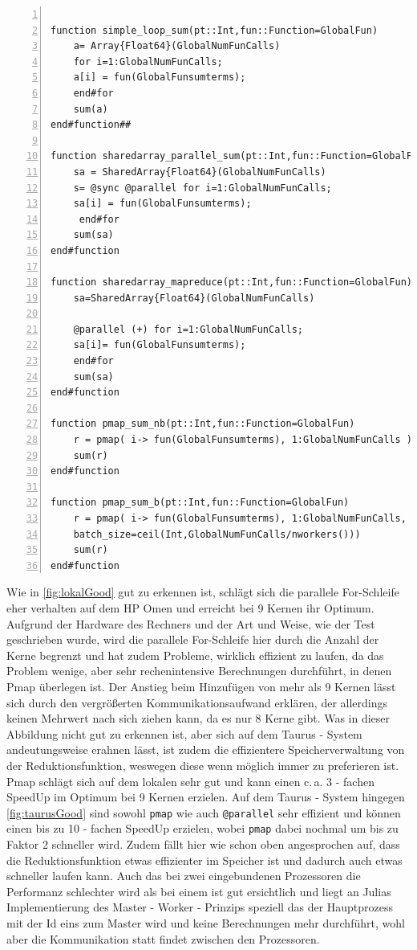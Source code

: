 \documentclass[proseminar,german,utf8]{zihpub}
\newcommand{\ca}[0]{{c.\,a. }}
\begin{document}
\begin{Verbatim}[baselinestretch=1,label=Code - Snippets der verschiedenen Verfahren,fontsize=\scriptsize,numbers=left,frame=single,stepnumber=5,xleftmargin=1cm,xrightmargin=1cm]

function simple_loop_sum(pt::Int,fun::Function=GlobalFun)
    a= Array{Float64}(GlobalNumFunCalls)
    for i=1:GlobalNumFunCalls; 
	a[i] = fun(GlobalFunsumterms); 
	end#for
    sum(a)
end#function##

function sharedarray_parallel_sum(pt::Int,fun::Function=GlobalFun)
    sa = SharedArray{Float64}(GlobalNumFunCalls)
    s= @sync @parallel for i=1:GlobalNumFunCalls; 
	sa[i] = fun(GlobalFunsumterms);
	 end#for
    sum(sa)
end#function

function sharedarray_mapreduce(pt::Int,fun::Function=GlobalFun)
    sa=SharedArray{Float64}(GlobalNumFunCalls)

    @parallel (+) for i=1:GlobalNumFunCalls; 
	sa[i]= fun(GlobalFunsumterms); 
	end#for
    sum(sa)
end#function

function pmap_sum_nb(pt::Int,fun::Function=GlobalFun)
    r = pmap( i-> fun(GlobalFunsumterms), 1:GlobalNumFunCalls )
    sum(r)
end#function

function pmap_sum_b(pt::Int,fun::Function=GlobalFun)
    r = pmap( i-> fun(GlobalFunsumterms), 1:GlobalNumFunCalls, 
	batch_size=ceil(Int,GlobalNumFunCalls/nworkers()))
    sum(r)
end#function
\end{Verbatim}

Wie in \ref{fig:lokalGood} gut zu erkennen ist, schlägt sich die parallele For-Schleife eher verhalten auf dem HP Omen und erreicht bei 9 Kernen ihr Optimum. Aufgrund der Hardware des Rechners und der Art und Weise, wie der Test geschrieben wurde, wird die parallele For-Schleife hier durch die Anzahl der Kerne begrenzt und hat zudem Probleme, wirklich effizient zu laufen, da das Problem wenige, aber sehr rechenintensive Berechnungen durchführt, in denen Pmap überlegen ist. Der Anstieg beim Hinzufügen von mehr als 9 Kernen lässt sich durch den vergrößerten Kommunikationsaufwand erklären, der allerdings keinen Mehrwert nach sich ziehen kann, da es nur 8 Kerne gibt. Was in dieser Abbildung nicht gut zu erkennen ist, aber sich auf dem Taurus - System andeutungsweise erahnen lässt, ist zudem die effizientere Speicherverwaltung von der Reduktionsfunktion, weswegen diese wenn möglich immer zu preferieren ist. Pmap schlägt sich auf dem lokalen sehr gut und kann einen \ca 3 - fachen SpeedUp im Optimum bei 9 Kernen erzielen. Auf dem Taurus - System hingegen \ref{fig:taurusGood} sind sowohl \verb|pmap| wie auch \verb|@parallel| sehr effizient und können einen bis zu 10 - fachen SpeedUp erzielen, wobei \verb|pmap| dabei nochmal um bis zu Faktor 2  schneller wird. Zudem fällt hier wie schon oben angesprochen auf, dass die Reduktionsfunktion etwas effizienter im Speicher ist und dadurch auch etwas schneller laufen kann. Auch das bei zwei eingebundenen Prozessoren die Performanz schlechter wird als bei einem ist gut ersichtlich und liegt an Julias Implementierung des Master - Worker - Prinzips speziell das der Hauptprozess mit der Id eins zum Master wird und keine Berechnungen mehr durchführt, wohl aber die Kommunikation statt findet zwischen den Prozessoren. 
\end{document}
